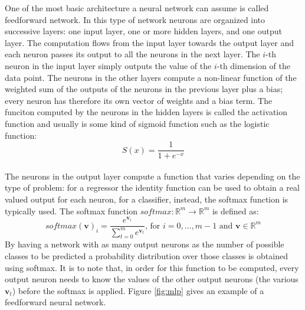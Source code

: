 \documentclass[12pt]{article}
\newcommand{\vect}[1]{\boldsymbol{#1}}
\begin{document}
One of the most basic architecture a neural network can assume is called feedforward network. In this type of network neurons are organized into successive layers: one input layer, one or more hidden layers, and one output layer. The computation flows from the input layer towards the output layer and each neuron passes its output to all the neurons in the next layer. The $i$-th neuron in the input layer simply outputs the value of the $i$-th dimension of the data point. The neurons in the other layers compute a non-linear function of the weighted sum of the outputs of the neurons in the previous layer plus a bias; every neuron has therefore its own vector of weights and a bias term. The funciton computed by the neurons in the hidden layers is called the activation function and usually is some kind of sigmoid function such as the logistic function:
\begin{equation}
\label{eq:sigmoid}
S(x) = \frac{1}{1 + e^{-x}}
\end{equation}\\
The neurons in the output layer compute a function that varies depending on the type of problem: for a regressor the identity function can be used to obtain a real valued output for each neuron, for a classifier, instead, the softmax function is typically used. The softmax function $ softmax: \mathbb{R}^m \rightarrow \mathbb{R}^m $ is defined as:
\begin{equation}
\label{eq:softmax}
softmax(\vect{v})_i = \frac{e^{\vect{v}_i}}{\sum_{t=0}^{m}e^{\vect{v}_t}} \text{, for } i = 0,\ldots,m-1 \text{ and } \vect{v} \in \mathbb{R}^m
\end{equation}
By having a network with as many output neurons as the number of possible classes to be predicted a probability distribution over those classes is obtained using softmax. It is to note that, in order for this function to be computed, every output neuron needs to know the values of the other output neurons (the various $ \vect{v}_t$) before the softmax is applied. Figure \ref{fig:mlp} gives an example of a feedforward neural network.
\end{document}
